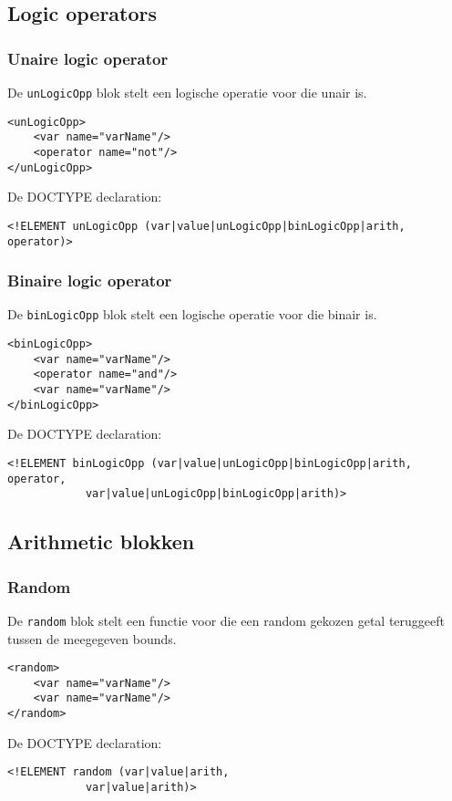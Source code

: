 \documentclass[]{article}
\begin{document}
\subsection{Logic operators}
\subsubsection{Unaire logic operator}
De \texttt{unLogicOpp} blok stelt een logische operatie voor die unair is. 
\lstset{language=XML}
\begin{lstlisting}
<unLogicOpp>
	<var name="varName"/>
	<operator name="not"/>
</unLogicOpp>
\end{lstlisting}
De DOCTYPE declaration: 
\lstset{language=XML}
\begin{lstlisting}
<!ELEMENT unLogicOpp (var|value|unLogicOpp|binLogicOpp|arith, operator)>
\end{lstlisting}

\subsubsection{Binaire logic operator}
De \texttt{binLogicOpp} blok stelt een logische operatie voor die binair is. 
\lstset{language=XML}
\begin{lstlisting}
<binLogicOpp>
	<var name="varName"/>
	<operator name="and"/>
	<var name="varName"/>
</binLogicOpp>
\end{lstlisting}
De DOCTYPE declaration: 
\lstset{language=XML}
\begin{lstlisting}
<!ELEMENT binLogicOpp (var|value|unLogicOpp|binLogicOpp|arith, operator, 
			var|value|unLogicOpp|binLogicOpp|arith)>
\end{lstlisting}

\subsection{Arithmetic blokken}
\subsubsection{Random}
De \texttt{random} blok stelt een functie voor die een random gekozen getal teruggeeft tussen de meegegeven bounds. 
\lstset{language=XML}
\begin{lstlisting}
<random>
	<var name="varName"/>
	<var name="varName"/>
</random>
\end{lstlisting}
De DOCTYPE declaration: 
\lstset{language=XML}
\begin{lstlisting}
<!ELEMENT random (var|value|arith, 
			var|value|arith)>
\end{lstlisting}
\end{document}
